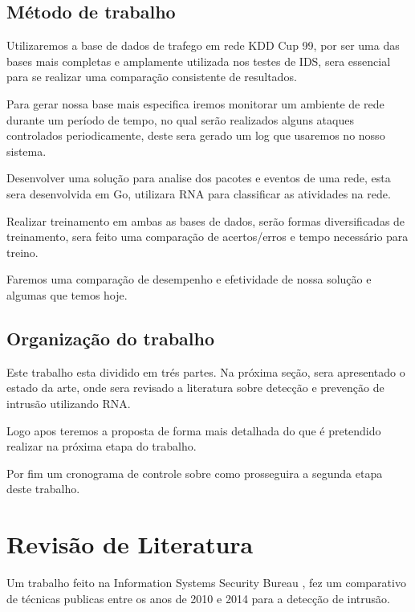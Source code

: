 \documentclass[
	12pt,				%
	openright,			%
	oneside,
	a4paper,			%
	english,			%
	french,				%
	spanish,			%
	brazil				%
	]{abntex2}
\begin{document}
\section{Método de trabalho}

Utilizaremos a base de dados de trafego em rede KDD Cup 99, por ser uma das bases mais completas e amplamente utilizada nos testes de IDS, sera essencial para se realizar uma comparação consistente de resultados.

Para gerar nossa base mais especifica iremos monitorar um ambiente de rede durante um período de tempo, no qual serão realizados alguns ataques controlados periodicamente, deste sera gerado um log que usaremos no nosso sistema.

Desenvolver uma solução para analise dos pacotes e eventos de uma rede, esta sera desenvolvida em Go, utilizara RNA para classificar as atividades na rede.

Realizar treinamento em ambas as bases de dados, serão formas diversificadas de treinamento, sera feito uma comparação de acertos/erros e tempo necessário para treino.

Faremos uma comparação de desempenho e efetividade de nossa solução e algumas que temos hoje.

\section{Organização do trabalho}

Este trabalho esta dividido em trés partes.
Na próxima seção, sera apresentado o estado da arte, onde sera revisado a literatura sobre detecção e prevenção de intrusão utilizando RNA.

Logo apos teremos a proposta  de forma mais detalhada do que é pretendido realizar na próxima etapa do trabalho.

Por fim um cronograma de controle sobre como prosseguira a segunda etapa deste trabalho.


\chapter[Revisão de Literatura]{Revisão de Literatura}

Um trabalho feito na Information Systems Security Bureau \cite{Stampar}, fez um comparativo de técnicas publicas entre os anos de 2010 e 2014 para a detecção de intrusão.
\end{document}
